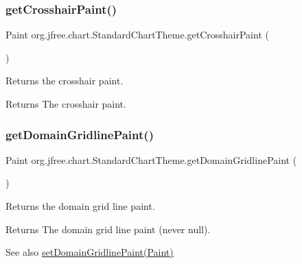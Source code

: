 \subsubsection{\texorpdfstring{get\+Crosshair\+Paint()}{getCrosshairPaint()}}
{\footnotesize\ttfamily Paint org.\+jfree.\+chart.\+Standard\+Chart\+Theme.\+get\+Crosshair\+Paint (\begin{DoxyParamCaption}{ }\end{DoxyParamCaption})}

Returns the crosshair paint.

\begin{DoxyReturn}{Returns}
The crosshair paint. 
\end{DoxyReturn}
\mbox{\label{classorg_1_1jfree_1_1chart_1_1_standard_chart_theme_a5061819d22f9e7d6f091160fd276396e}} 
\subsubsection{\texorpdfstring{get\+Domain\+Gridline\+Paint()}{getDomainGridlinePaint()}}
{\footnotesize\ttfamily Paint org.\+jfree.\+chart.\+Standard\+Chart\+Theme.\+get\+Domain\+Gridline\+Paint (\begin{DoxyParamCaption}{ }\end{DoxyParamCaption})}

Returns the domain grid line paint.

\begin{DoxyReturn}{Returns}
The domain grid line paint (never {\ttfamily null}).
\end{DoxyReturn}
\begin{DoxySeeAlso}{See also}
\mbox{\hyperlink{classorg_1_1jfree_1_1chart_1_1_standard_chart_theme_a4dbda23eca8a76a55f4db9732e2b8957}{set\+Domain\+Gridline\+Paint(\+Paint)}} 
\end{DoxySeeAlso}
\mbox{\label{classorg_1_1jfree_1_1chart_1_1_standard_chart_theme_ae65c77546155e63cdbd2f84a003c1321}} 
